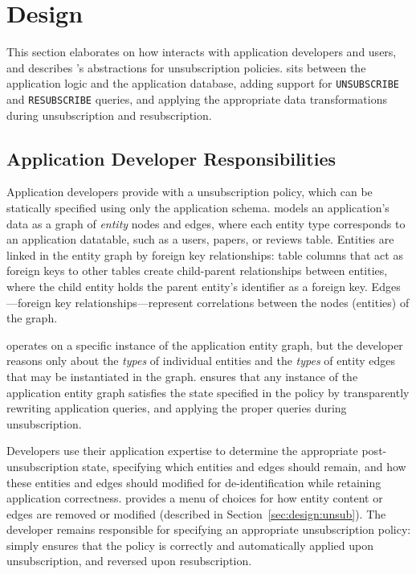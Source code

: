 \section{Design}
This section elaborates on how \sys interacts with application developers and users, and describes
\sys's abstractions for unsubscription policies.
\sys sits between the application logic and the application database, adding support for
\texttt{UNSUBSCRIBE} and \texttt{RESUBSCRIBE} queries, and applying the appropriate data transformations
during unsubscription and resubscription.

\subsection{Application Developer Responsibilities}
Application developers provide \sys with a unsubscription policy, which can be statically specified
using only the application schema.  \sys models an application's data as a graph of \emph{entity}
nodes and edges, where each entity type corresponds to an application datatable, such as a users,
papers, or reviews table.  Entities are linked in the entity graph by foreign key relationships:
table columns that act as foreign keys to other tables create child-parent relationships between
entities, where the child entity holds the parent entity's identifier as a foreign key. 
Edges---foreign key relationships---represent correlations between the nodes (entities) of the
graph.

\sys operates on a specific instance of the application entity graph, but the developer reasons only
about the \emph{types} of individual entities and the \emph{types} of entity edges that may be
instantiated in the graph. \sys ensures that any instance of the application entity graph satisfies
the state specified in the policy by transparently rewriting application queries, and applying the
proper queries during unsubscription.

Developers use their application expertise to determine the appropriate post-unsubscription state,
specifying which entities and edges should remain, and how these entities and edges should modified
for de-identification while retaining application correctness. \sys provides a menu of choices for
how entity content or edges are removed or modified (described in Section~\ref{sec:design:unsub}).
The developer remains responsible for specifying an appropriate unsubscription policy: \sys simply
ensures that the policy is correctly and automatically applied upon unsubscription, and reversed
upon resubscription.

